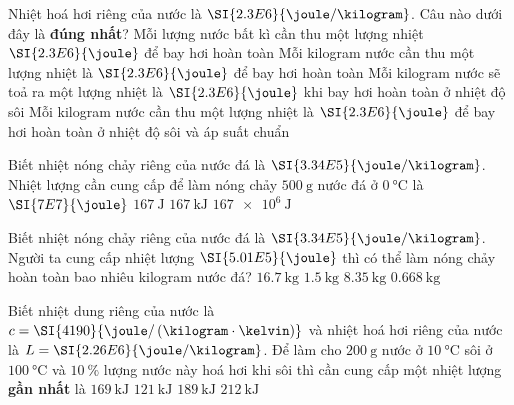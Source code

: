 \begin{ex}
	Nhiệt hoá hơi riêng của nước là $\SI{2.3E6}{\joule/\kilogram}$. Câu nào dưới đây là \textbf{đúng nhất}?
	\choice
	{Mỗi lượng nước bất kì cần thu một lượng nhiệt $\SI{2.3E6}{\joule}$ để bay hơi hoàn toàn}
	{Mỗi kilogram nước cần thu một lượng nhiệt là $\SI{2.3E6}{\joule}$ để bay hơi hoàn toàn}
	{Mỗi kilogram nước sẽ toả ra một lượng nhiệt là $\SI{2.3E6}{\joule}$ khi bay hơi hoàn toàn ở nhiệt độ sôi}
	{\True Mỗi kilogram nước cần thu một lượng nhiệt là $\SI{2.3E6}{\joule}$ để bay hơi hoàn toàn ở nhiệt độ sôi và áp suất chuẩn}
	\loigiai{}
\end{ex}
\begin{ex}
	Biết nhiệt nóng chảy riêng của nước đá là $\SI{3.34E5}{\joule/\kilogram}$. Nhiệt lượng cần cung cấp để làm nóng chảy $\SI{500}{\gram}$ nước đá ở $\SI{0}{\celsius}$ là
	\choice
	{$\SI{7E7}{\joule}$}
	{$\SI{167}{\joule}$}
	{\True $\SI{167}{\kilo\joule}$}
	{$\SI{167e6}{\joule}$}
\end{ex}
\begin{ex}
	Biết nhiệt nóng chảy riêng của nước đá là $\SI{3.34E5}{\joule/\kilogram}$. Người ta cung cấp nhiệt lượng $\SI{5.01E5}{\joule}$ thì có thể làm nóng chảy hoàn toàn bao nhiêu kilogram nước đá?
	\choice
	{$\SI{16.7}{\kilogram}$}
	{\True $\SI{1.5}{\kilogram}$}
	{$\SI{8.35}{\kilogram}$}
	{$\SI{0.668}{\kilogram}$}
\end{ex}
\begin{ex}
	Biết nhiệt dung riêng của nước là $c=\SI{4190}{\joule/\left(\kilogram\cdot\kelvin\right)}$ và nhiệt hoá hơi riêng của nước là $L=\SI{2.26E6}{\joule/\kilogram}$. Để làm cho $\SI{200}{\gram}$ nước ở $\SI{10}{\celsius}$ sôi ở $\SI{100}{\celsius}$ và $\SI{10}{\percent}$ lượng nước này hoá hơi khi sôi thì cần cung cấp một nhiệt lượng \textbf{gần nhất} là
	\choice
	{$\SI{169}{\kilo\joule}$}
	{\True $\SI{121}{\kilo\joule}$}
	{$\SI{189}{\kilo\joule}$}
	{$\SI{212}{\kilo\joule}$}
\end{ex}
